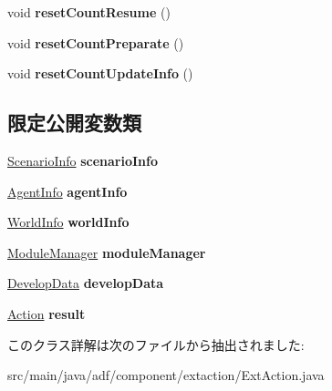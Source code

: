 \begin{DoxyCompactItemize}
\hypertarget{classadf_1_1component_1_1extaction_1_1ExtAction_aec14278468b22caf8ec9a8e865726ca3}{}\label{classadf_1_1component_1_1extaction_1_1ExtAction_aec14278468b22caf8ec9a8e865726ca3} 
void {\bfseries reset\+Count\+Resume} ()
\item 
\hypertarget{classadf_1_1component_1_1extaction_1_1ExtAction_a44438cee2777f74e41225cc8711b4dbc}{}\label{classadf_1_1component_1_1extaction_1_1ExtAction_a44438cee2777f74e41225cc8711b4dbc} 
void {\bfseries reset\+Count\+Preparate} ()
\item 
\hypertarget{classadf_1_1component_1_1extaction_1_1ExtAction_ae6d1f7c8d3e354ad221454139c9ef2bb}{}\label{classadf_1_1component_1_1extaction_1_1ExtAction_ae6d1f7c8d3e354ad221454139c9ef2bb} 
void {\bfseries reset\+Count\+Update\+Info} ()
\end{DoxyCompactItemize}
\subsection*{限定公開変数類}
\begin{DoxyCompactItemize}
\item 
\hypertarget{classadf_1_1component_1_1extaction_1_1ExtAction_a6fbc25311a85d78fa3f49e9264d657b8}{}\label{classadf_1_1component_1_1extaction_1_1ExtAction_a6fbc25311a85d78fa3f49e9264d657b8} 
\hyperlink{classadf_1_1agent_1_1info_1_1ScenarioInfo}{Scenario\+Info} {\bfseries scenario\+Info}
\item 
\hypertarget{classadf_1_1component_1_1extaction_1_1ExtAction_a06db73f1d9fffdf42af9fccae0a6e2d1}{}\label{classadf_1_1component_1_1extaction_1_1ExtAction_a06db73f1d9fffdf42af9fccae0a6e2d1} 
\hyperlink{classadf_1_1agent_1_1info_1_1AgentInfo}{Agent\+Info} {\bfseries agent\+Info}
\item 
\hypertarget{classadf_1_1component_1_1extaction_1_1ExtAction_a641f11ee5304c24ffabcc452830261e7}{}\label{classadf_1_1component_1_1extaction_1_1ExtAction_a641f11ee5304c24ffabcc452830261e7} 
\hyperlink{classadf_1_1agent_1_1info_1_1WorldInfo}{World\+Info} {\bfseries world\+Info}
\item 
\hypertarget{classadf_1_1component_1_1extaction_1_1ExtAction_a9d41b6d5cf350972b6b6dd9343162cfe}{}\label{classadf_1_1component_1_1extaction_1_1ExtAction_a9d41b6d5cf350972b6b6dd9343162cfe} 
\hyperlink{classadf_1_1agent_1_1module_1_1ModuleManager}{Module\+Manager} {\bfseries module\+Manager}
\item 
\hypertarget{classadf_1_1component_1_1extaction_1_1ExtAction_a628aa58b77cb5ec94fe56f6f20f6c019}{}\label{classadf_1_1component_1_1extaction_1_1ExtAction_a628aa58b77cb5ec94fe56f6f20f6c019} 
\hyperlink{classadf_1_1agent_1_1develop_1_1DevelopData}{Develop\+Data} {\bfseries develop\+Data}
\item 
\hypertarget{classadf_1_1component_1_1extaction_1_1ExtAction_a10762c84b9058147d4e9e4813a4f6466}{}\label{classadf_1_1component_1_1extaction_1_1ExtAction_a10762c84b9058147d4e9e4813a4f6466} 
\hyperlink{classadf_1_1agent_1_1action_1_1Action}{Action} {\bfseries result}
\end{DoxyCompactItemize}


このクラス詳解は次のファイルから抽出されました\+:\begin{DoxyCompactItemize}
\item 
src/main/java/adf/component/extaction/Ext\+Action.\+java\end{DoxyCompactItemize}
